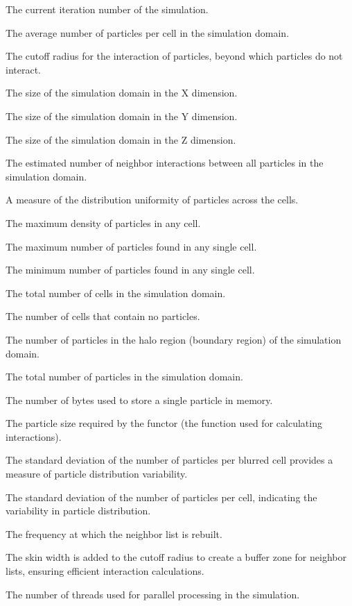 \begin{description}[style=multiline, leftmargin =40mm]
  \item [Iteration] The current iteration number of the simulation.
  \item [avgParticlesPerCell] The average number of particles per cell in the simulation domain.
  \item [cutoff] The cutoff radius for the interaction of particles, beyond which particles do not interact.
  \item [domainSizeX] The size of the simulation domain in the X dimension.
  \item [domainSizeY] The size of the simulation domain in the Y dimension.
  \item [domainSizeZ] The size of the simulation domain in the Z dimension.
  \item [estimatedNumNeighborInteractions] The estimated number of neighbor interactions between all particles in the simulation domain.
  \item [homogeneity] A measure of the distribution uniformity of particles across the cells.
  \item [maxDensity] The maximum density of particles in any cell.
  \item [maxParticlesPerCell] The maximum number of particles found in any single cell.
  \item [minParticlesPerCell] The minimum number of particles found in any single cell.
  \item [numCells] The total number of cells in the simulation domain.
  \item [numEmptyCells] The number of cells that contain no particles.
  \item [numHaloParticles] The number of particles in the halo region (boundary region) of the simulation domain.
  \item [numParticles] The total number of particles in the simulation domain.
  \item [particleSize] The number of bytes used to store a single particle in memory.
  \item [particleSizeNeededByFunctor] The particle size required by the functor (the function used for calculating interactions).
  \item [particlesPerBlurredCellStdDev] The standard deviation of the number of particles per blurred cell provides a measure of particle distribution variability.
  \item [particlesPerCellStdDev] The standard deviation of the number of particles per cell, indicating the variability in particle distribution.
  \item [rebuildFrequency] The frequency at which the neighbor list is rebuilt.
  \item [skin] The skin width is added to the cutoff radius to create a buffer zone for neighbor lists, ensuring efficient interaction calculations.
  \item [threadCount] The number of threads used for parallel processing in the simulation.
\end{description}



